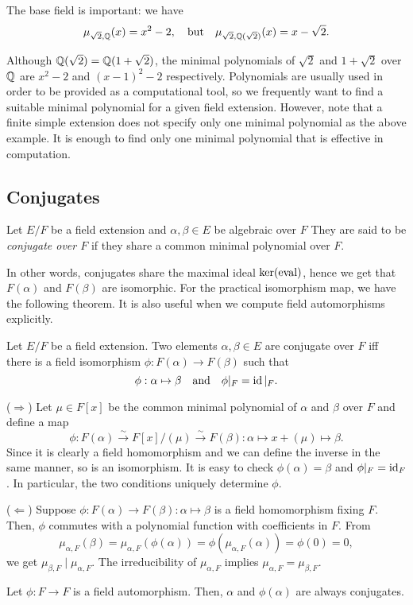 \documentclass{../note}
\begin{document}
\begin{ex}
The base field is important: we have
\[\mu_{\sqrt2,\mathbb{Q}}(x)=x^2-2,\quad\text{but}\quad\mu_{\sqrt2,\mathbb{Q}(\sqrt2)}(x)=x-\sqrt2.\]
\end{ex}

\begin{ex}
Although $\mathbb{Q}(\sqrt2)=\mathbb{Q}(1+\sqrt2)$, the minimal polynomials of $\sqrt2$ and $1+\sqrt2$ over $\mathbb{Q}$ are $x^2-2$ and $(x-1)^2-2$ respectively.
Polynomials are usually used in order to be provided as a computational tool, so we frequently want to find a suitable minimal polynomial for a given field extension.
However, note that a finite simple extension does not specify only one minimal polynomial as the above example.
It is enough to find only one minimal polynomial that is effective in computation.
\end{ex}

\subsection{Conjugates}

\begin{defn}
Let $E/F$ be a field extension and $\alpha,\beta\in E$ be algebraic over $F$
They are said to be \emph{conjugate over $F$} if they share a common minimal polynomial over $F$.
\end{defn}

In other words, conjugates share the maximal ideal $\ker(\operatorname{eval})$, hence we get that $F(\alpha)$ and $F(\beta)$ are isomorphic.
For the practical isomorphism map, we have the following theorem.
It is also useful when we compute field automorphisms explicitly.

\begin{thm}
Let $E/F$ be a field extension.
Two elements $\alpha,\beta\in E$ are conjugate over $F$ iff there is a field isomorphism $\phi:F(\alpha)\to F(\beta)$ such that
\[\phi:\alpha\mapsto\beta\quad\text{and}\quad\phi|_F=\operatorname{id}|_F.\]
\end{thm}
\begin{pf}
($\Rightarrow$)
Let $\mu\in F[x]$ be the common minimal polynomial of $\alpha$ and $\beta$ over $F$ and define a map
\[\phi:F(\alpha)\stackrel\sim\to F[x]/(\mu)\stackrel\sim\to F(\beta):\alpha\mapsto x+(\mu)\mapsto\beta.\]
Since it is clearly a field homomorphism and we can define the inverse in the same manner, so is an isomorphism.
It is easy to check $\phi(\alpha)=\beta$ and $\phi|_F=\operatorname{id}_F$.
In particular, the two conditions uniquely determine $\phi$.

($\Leftarrow$)
Suppose $\phi:F(\alpha)\to F(\beta):\alpha\mapsto\beta$ is a field homomorphism fixing $F$.
Then, $\phi$ commutes with a polynomial function with coefficients in $F$.
From
\[\mu_{\alpha,F}(\beta)=\mu_{\alpha,F}(\phi(\alpha))=\phi(\mu_{\alpha,F}(\alpha))=\phi(0)=0,\]
we get $\mu_{\beta,F}\mid\mu_{\alpha,F}$.
The irreducibility of $\mu_{\alpha,F}$ implies $\mu_{\alpha,F}=\mu_{\beta,F}$.
\end{pf}
\begin{cor}
Let $\phi:F\to F$ is a field automorphism.
Then, $\alpha$ and $\phi(\alpha)$ are always conjugates.
\end{cor}
\end{document}
